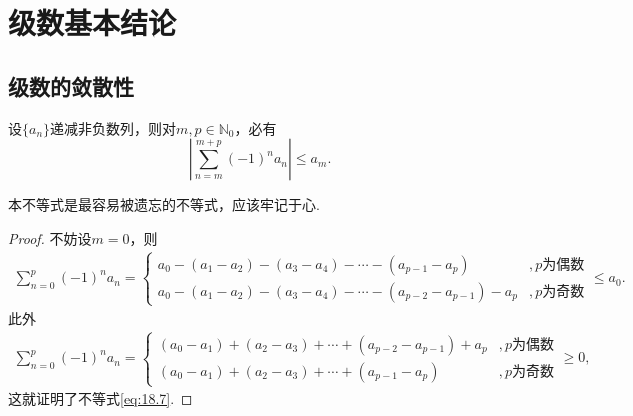 \documentclass[../../main.tex]{subfiles}
\begin{document}
\section{级数基本结论}

\subsection{级数的敛散性}

\begin{theorem}[交错级数不等式]\label{theorem:交错级数不等式}
设\(\{a_n\}\)递减非负数列，则对\(m,p\in \mathbb{N}_0\)，必有
\begin{equation}\label{eq:18.7}
\left|\sum_{n = m}^{m + p} (-1)^n a_n\right| \leqslant a_m.
\end{equation}
\end{theorem}
\begin{note}
本不等式是最容易被遗忘的不等式，应该牢记于心.
\end{note}
\begin{proof}
不妨设\(m = 0\)，则
\begin{align*}
\sum_{n = 0}^{p} (-1)^n a_n = 
\begin{cases}
a_0 - (a_1 - a_2) - (a_3 - a_4) - \cdots - (a_{p - 1} - a_p) &, p\text{为偶数} \\
a_0 - (a_1 - a_2) - (a_3 - a_4) - \cdots - (a_{p - 2} - a_{p - 1}) - a_p &, p\text{为奇数}
\end{cases}
\leqslant a_0.
\end{align*}
此外
\begin{align*}
\sum_{n = 0}^{p} (-1)^n a_n = 
\begin{cases}
(a_0 - a_1) + (a_2 - a_3) + \cdots + (a_{p - 2} - a_{p - 1}) + a_p &, p\text{为偶数} \\
(a_0 - a_1) + (a_2 - a_3) + \cdots + (a_{p - 1} - a_p) &, p\text{为奇数}
\end{cases}
\geqslant 0,
\end{align*}
这就证明了不等式\eqref{eq:18.7}.
\end{proof}
\end{document}
